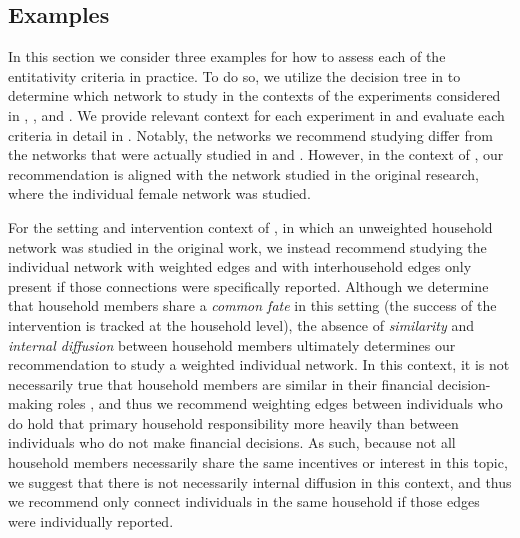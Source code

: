 \subsection{Examples} \label{subsec:rec_ex}
In this section we consider three examples for how to assess each of the entitativity criteria in practice. To do so, we utilize the decision tree in  to determine which network to study in the contexts of the experiments considered in \cite{banerjee2013}, \cite{alexander2022algorithms}, and \cite{airoldi2024}. We provide relevant context for each experiment in  and evaluate each criteria in detail in . Notably, the networks we recommend studying differ from the networks that were actually studied in \cite{banerjee2013} and \cite{airoldi2024}. However, in the context of \cite{alexander2022algorithms}, our recommendation is aligned with the network studied in the original research, where the individual female network was studied.

For the setting and intervention context of \citet{banerjee2013}, in which an unweighted household network was studied in the original work, we instead recommend studying the individual network with weighted edges and with interhousehold edges only present if those connections were specifically reported. Although we determine that household members share a \textit{common fate} in this setting (the success of the intervention is tracked at the household level), the absence of \textit{similarity} and \textit{internal diffusion} between household members ultimately determines our recommendation to study a weighted individual network. In this context, it is not necessarily true that household members are similar in their financial decision-making roles \citep[e.g.,]{holvoet2005impact}, and thus we recommend weighting edges between individuals who do hold that primary household responsibility more heavily than between individuals who do not make financial decisions. As such, because not all household members necessarily share the same incentives or interest in this topic, we suggest that there is not necessarily internal diffusion in this context, and thus we recommend only connect individuals in the same household if those edges were individually reported.


